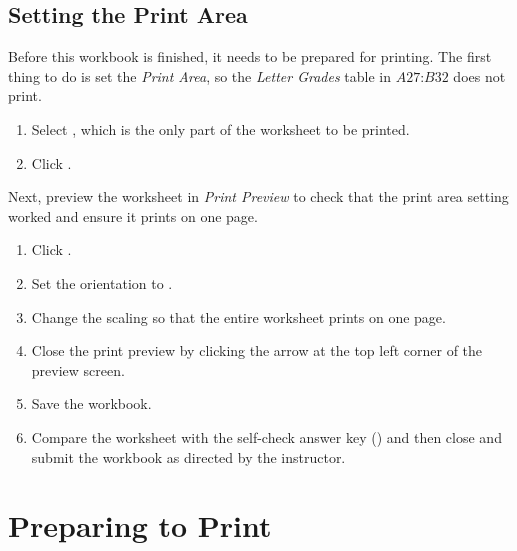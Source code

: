 \subsection{Setting the Print Area}

Before this workbook is finished, it needs to be prepared for printing. The first thing to do is set the \textit{Print Area}, so the \textit{Letter Grades} table in $ A27 $:$ B32 $ does not print.

\begin{enumbox}
	\begin{enumerate}
		\item Select , which is the only part of the worksheet to be printed.
		\item Click .
	\end{enumerate}
\end{enumbox}

Next, preview the worksheet in \textit{Print Preview} to check that the print area setting worked and ensure it prints on one page.

\begin{enumbox}
	\begin{enumerate}
		\item Click .
		\item Set the orientation to .
		\item Change the scaling so that the entire worksheet prints on one page.
		\item Close the print preview by clicking the arrow at the top left corner of the preview screen.
		\item Save the  workbook.
		\item Compare the worksheet with the self-check answer key () and then close and submit the  workbook as directed by the instructor.
	\end{enumerate}
\end{enumbox}
	
\section{Preparing to Print}

